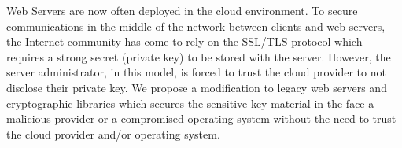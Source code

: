 \documentclass[../main.tex]{subfiles}
\begin{document}
   

\noindent 
Web Servers are now often deployed in the cloud environment. To
secure communications in the middle of the network between clients and web
servers, the Internet community has come to rely on the SSL/TLS protocol which
requires a strong secret (private key) to be stored with the server. However,
the server administrator, in this model, is forced to trust the cloud provider
to not disclose their private key. We propose a modification to legacy web
servers and cryptographic libraries which secures the sensitive key material
in the face a malicious provider or a compromised operating system without
the need to trust the cloud provider and/or operating system.
\end{document}
